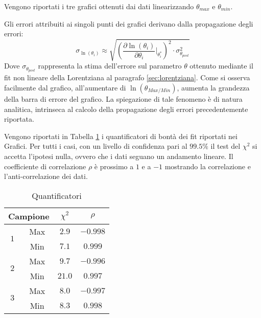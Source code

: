 \documentclass[a4paper,11pt,oneside]{article}
\begin{document}
\begin{figure}[h!]
    \centering
    \newline
    \caption*{}
\end{figure}
Vengono riportati i tre grafici ottenuti dai dati linearizzando $\theta_{max}$ e $\theta_{min}$.

Gli errori attribuiti ai singoli punti dei grafici derivano dalla propagazione degli errori:
\begin{equation*}
 \sigma_{\ln (\theta_i)}\approx \sqrt{\left (\frac{\partial \ln (\theta_i)}{\partial \theta_i} \Big|_{\theta_i^{\ast}} \right )^{2} \cdot \sigma_{\theta_{post}}^2}
\end{equation*}
Dove $\sigma_{\theta_{post}}$ rappresenta la stima dell'errore sul parametro $\theta$ ottenuto mediante il fit non lineare della Lorentziana al paragrafo \ref{sec:lorentziana}.
Come si osserva facilmente dal grafico, all'aumentare di $\ln({\theta_{Max/Min}})$, aumenta la grandezza della barra di errore del grafico. La spiegazione di tale fenomeno è di natura analitica, intrinseca al calcolo della propagazione degli errori precedentemente riportata.

Vengono riportati in Tabella \ref{tab:quantificatori} i quantificatori di bontà dei fit riportati nei Grafici. Per tutti i casi, con un livello di confidenza pari al $99.5\%$ il test del $\chi^{2}$  si accetta l'ipotesi nulla, ovvero che i dati seguano un andamento lineare. Il coefficiente di correlazione $\rho$ è prossimo a $1$ e a $-1$ mostrando la correlazione e l'anti-correlazione dei dati.


\begin{table}[h!]
    \centering
    \begin{tabular}{|c|c|c|c|}
        \hline
        \multicolumn{2}{|c|}{Campione} & $\chi^2$ & $\rho$ \\ \hline
        \multirow{2}{*}{$1$} & \cellcolor[rgb]{0.85,0.85,0.85}Max & \cellcolor[rgb]{0.85,0.85,0.85}$2.9$ & \cellcolor[rgb]{0.85,0.85,0.85}$-0.998$ \\ \cline{2-4}
        & Min & $7.1$ & $0.999$\\ \hline
        \multirow{2}{*}{$2$} & \cellcolor[rgb]{0.85,0.85,0.85}Max & \cellcolor[rgb]{0.85,0.85,0.85}$9.7$ & \cellcolor[rgb]{0.85,0.85,0.85}$-0.996$ \\ \cline{2-4}
        & Min & $21.0$ & $0.997$\\ \hline
        \multirow{2}{*}{$3$} & \cellcolor[rgb]{0.85,0.85,0.85}Max & \cellcolor[rgb]{0.85,0.85,0.85}$8.0$ & \cellcolor[rgb]{0.85,0.85,0.85}$-0.997$ \\ \cline{2-4}
        & Min & $8.3$ & $0.998$\\ \hline
    \end{tabular}
    \caption{Quantificatori}
    \label{tab:quantificatori}
\end{table}
\end{document}
